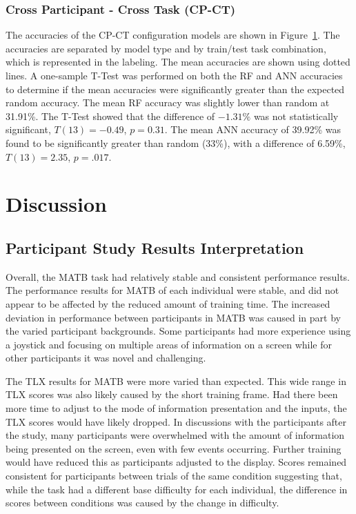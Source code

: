 \documentclass[11pt]{article}
\begin{document}
		\subsubsection{Cross Participant - Cross Task (CP-CT)}
		The accuracies of the CP-CT configuration models are shown in Figure~\ref{fig:cp-ct}. The accuracies are separated by model type and by train/test task combination, which is represented in the labeling. The mean accuracies are shown using dotted lines. A one-sample T-Test was performed on both the RF and ANN accuracies to determine if the mean accuracies were significantly greater than the expected random accuracy. The mean RF accuracy was slightly lower than random at 31.91\%. The T-Test showed that the difference of \(-1.31\%\) was not statistically significant, \(T(13) = -0.49\), \(p = 0.31\). The mean ANN accuracy of 39.92\% was found to be significantly greater than random (33\%), with a difference of 6.59\%, \(T(13) = 2.35\), \(p = .017\).
		
		\begin{figure}
		\centering
		\caption{}
		\label{fig:cp-ct}
		\end{figure} 

		
\section{Discussion}
	\subsection{Participant Study Results Interpretation}
	
	Overall, the MATB task had relatively stable and consistent performance results. The performance results for MATB of each individual were stable, and did not appear to be affected by the reduced amount of training time. The increased deviation in performance between participants in MATB was caused in part by the varied participant backgrounds. Some participants had more experience using a joystick and focusing on multiple areas of information on a screen while for other participants it was novel and challenging. 
	
	The TLX results for MATB were more varied than expected. This wide range in TLX scores was also likely caused by the short training frame. Had there been more time to adjust to the mode of information presentation and the inputs, the TLX scores would have likely dropped. In discussions with the participants after the study, many participants were overwhelmed with the amount of information being presented on the screen, even with few events occurring. Further training would have reduced this as participants adjusted to the display. Scores remained consistent for participants between trials of the same condition suggesting that, while the task had a different base difficulty for each individual, the difference in scores between conditions was caused by the change in difficulty.
	
\end{document}
